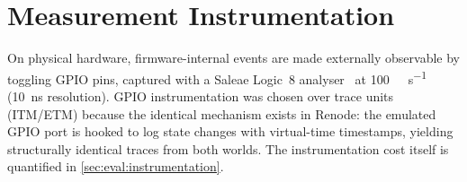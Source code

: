 \section{Measurement Instrumentation}
\label{sec:bg:instrumentation}

On physical hardware, firmware-internal events are made externally
observable by toggling GPIO pins, captured with a Saleae Logic~8
analyser~\cite{saleae} at \SI{100}{\mega\sample\per\second} (\SI{10}{\nano\second}
resolution). GPIO instrumentation was chosen over trace units (ITM/ETM)
because the identical mechanism exists in Renode: the emulated GPIO
port is hooked to log state changes with virtual-time timestamps,
yielding structurally identical traces from both worlds. The
instrumentation cost itself is quantified in
\cref{sec:eval:instrumentation}.
